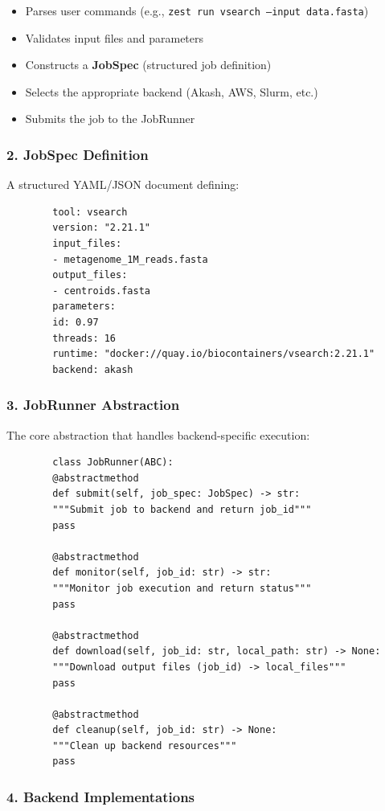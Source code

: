 \documentclass[11pt,a4paper]{article}
\newcommand{\highlight}[1]{\textbf{\color{darkblue}#1}}
\begin{document}
	\begin{itemize}
		\item Parses user commands (e.g., \texttt{zest run vsearch --input data.fasta})
		\item Validates input files and parameters
		\item Constructs a \highlight{JobSpec} (structured job definition)
		\item Selects the appropriate backend (Akash, AWS, Slurm, etc.)
		\item Submits the job to the JobRunner
	\end{itemize}
	
	\subsubsection{2. JobSpec Definition}
	
	A structured YAML/JSON document defining:
	
	\begin{lstlisting}
		tool: vsearch
		version: "2.21.1"
		input_files:
		- metagenome_1M_reads.fasta
		output_files:
		- centroids.fasta
		parameters:
		id: 0.97
		threads: 16
		runtime: "docker://quay.io/biocontainers/vsearch:2.21.1"
		backend: akash
	\end{lstlisting}
	
	\subsubsection{3. JobRunner Abstraction}
	
	The core abstraction that handles backend-specific execution:
	
	\begin{lstlisting}
		class JobRunner(ABC):
		@abstractmethod
		def submit(self, job_spec: JobSpec) -> str:
		"""Submit job to backend and return job_id"""
		pass
		
		@abstractmethod
		def monitor(self, job_id: str) -> str:
		"""Monitor job execution and return status"""
		pass
		
		@abstractmethod
		def download(self, job_id: str, local_path: str) -> None:
		"""Download output files (job_id) -> local_files"""
		pass
		
		@abstractmethod
		def cleanup(self, job_id: str) -> None:
		"""Clean up backend resources"""
		pass
	\end{lstlisting}
	
	\subsubsection{4. Backend Implementations}
	
\end{document}
